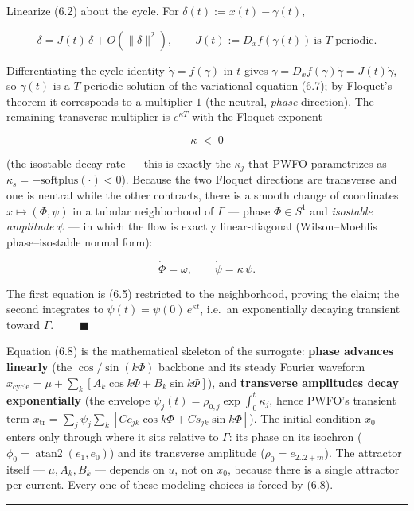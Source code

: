 \documentclass[
  11pt,
]{article}
\providecommand{\lt}{<}
\begin{document}
Linearize (6.2) about the cycle. For \(\delta(t):=x(t)-\gamma(t)\),

\[
\dot\delta = J(t)\,\delta+O(\|\delta\|^2),\qquad J(t):=D_xf(\gamma(t))\ \text{is } T\text{-periodic}.
\tag{6.7}
\]

Differentiating the cycle identity \(\dot\gamma=f(\gamma)\) in \(t\)
gives \(\ddot\gamma=D_xf(\gamma)\dot\gamma=J(t)\dot\gamma\), so
\(\dot\gamma(t)\) is a \(T\)-periodic solution of the variational
equation (6.7); by Floquet's theorem it corresponds to a multiplier
\(1\) (the neutral, \emph{phase} direction). The remaining transverse
multiplier is \(e^{\kappa T}\) with the Floquet exponent

\[
\kappa \;\lt \;0
\]

(the isostable decay rate --- this is exactly the \(\kappa_j\) that PWFO
parametrizes as \(\kappa_s=-\mathrm{softplus}(\cdot)\lt 0\)). Because
the two Floquet directions are transverse and one is neutral while the
other contracts, there is a smooth change of coordinates
\(x\mapsto(\Phi,\psi)\) in a tubular neighborhood of \(\Gamma\) ---
phase \(\Phi\in S^1\) and \emph{isostable amplitude} \(\psi\) --- in
which the flow is exactly linear-diagonal (Wilson--Moehlis
phase--isostable normal form):

\[
\dot\Phi=\omega,\qquad \dot\psi=\kappa\,\psi .
\tag{6.8}
\]

The first equation is (6.5) restricted to the neighborhood, proving the
claim; the second integrates to \(\psi(t)=\psi(0)\,e^{\kappa t}\),
i.e.~an exponentially decaying transient toward \(\Gamma\).
\(\qquad\blacksquare\)

Equation (6.8) is the mathematical skeleton of the surrogate:
\textbf{phase advances linearly} (the \(\cos/\sin(k\Phi)\) backbone and
its steady Fourier waveform
\(x_{\text{cycle}}=\mu+\sum_k[A_k\cos k\Phi+B_k\sin k\Phi]\)), and
\textbf{transverse amplitudes decay exponentially} (the envelope
\(\psi_j(t)=\rho_{0,j}\exp\!\int_0^t\kappa_j\), hence PWFO's transient
term
\(x_{\text{tr}}=\sum_j\psi_j\sum_k[Cc_{jk}\cos k\Phi+Cs_{jk}\sin k\Phi]\)).
The initial condition \(x_0\) enters only through where it sits relative
to \(\Gamma\): its phase on its isochron
(\(\phi_0=\operatorname{atan2}(e_1,e_0)\)) and its transverse amplitude
(\(\rho_0=e_{2..2+m}\)). The attractor itself --- \(\mu, A_k, B_k\) ---
depends on \(u\), not on \(x_0\), because there is a single attractor
per current. Every one of these modeling choices is forced by (6.8).

\begin{center}\rule{0.5\linewidth}{0.5pt}\end{center}
\end{document}
